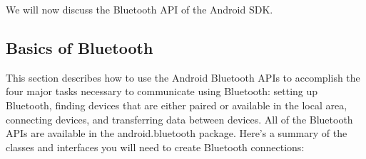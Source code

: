 \documentclass[11pt]{report}
\begin{document}
{{We will now discuss the Bluetooth API of the Android SDK.
 
\subsection{Basics of Bluetooth} 

This section describes how to use the Android Bluetooth APIs to accomplish the four major tasks necessary to communicate using Bluetooth: setting up Bluetooth, finding devices that are either paired or available in the local area, connecting devices, and transferring data between devices.
All of the Bluetooth APIs are available in the android.bluetooth package. Here's a summary of the classes and interfaces you will need to create Bluetooth connections:
\begin{enumerate}


\end{enumerate}}}
\end{document}
